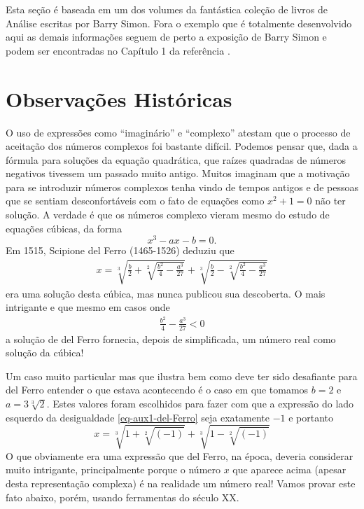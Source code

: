 \begin{subappendices}

Esta seção é baseada em um dos volumes da fantástica coleção de livros de Análise 
escritas por Barry Simon. Fora o exemplo que é totalmente desenvolvido aqui 
as demais informações seguem de perto a exposição de Barry Simon e
podem ser encontradas no Capítulo 1 da referência \cite{MR3443339}.



\section{Observações Históricas}
O uso de expressões como ``imaginário'' e ``complexo'' atestam que o processo de aceitação 
dos números complexos foi bastante difícil. Podemos pensar que, 
dada a fórmula para soluções da equação quadrática, que raízes quadradas 
de números negativos tivessem um passado muito antigo. 
Muitos imaginam que a motivação para se introduzir números complexos
tenha vindo de tempos antigos e de pessoas 
que se sentiam desconfortáveis com o fato de equações como $x^2+1=0$ 
não ter solução. A verdade é que os números complexo vieram mesmo do estudo 
de equações cúbicas, da forma 
\[
x^3-ax-b=0.
\]
Em 1515, Scipione del Ferro (1465-1526) deduziu que 
\begin{align}\label{formula-del-Ferro}
x
=
\sqrt[3]{ \frac{b}{2} +  \sqrt[2]{ \frac{b^2}{4}-\frac{a^3}{27} }  }
+
\sqrt[3]{ \frac{b}{2} -  \sqrt[2]{ \frac{b^2}{4}-\frac{a^3}{27} }  }
\end{align}
era uma solução desta cúbica, mas nunca publicou sua descoberta.
O mais intrigante e que mesmo em casos onde 
\begin{align}\label{eq-aux1-del-Ferro} 
\frac{b^2}{4}-\frac{a^3}{27}<0
\end{align}
a solução de del Ferro fornecia, depois de simplificada, um número real como solução da cúbica!

Um caso muito particular mas que ilustra bem como deve ter sido desafiante para del Ferro 
entender o que estava acontecendo é o caso em que tomamos $b=2$ e $a=3\sqrt[3]{2}$.
Estes valores foram escolhidos para fazer com que a expressão do lado esquerdo da desigualdade \eqref{eq-aux1-del-Ferro}
seja exatamente $-1$ e portanto
\[
x =
\sqrt[3]{1+\sqrt[2]{(-1)}}
+
\sqrt[3]{1-\sqrt[2]{(-1)}}
\]
O que obviamente era uma expressão que del Ferro, na época, deveria considerar muito intrigante,
principalmente porque o número $x$ que aparece acima (apesar desta representação complexa) 
é na realidade um número real! Vamos provar este 
fato abaixo, porém, usando ferramentas do século XX.


\end{subappendices}
